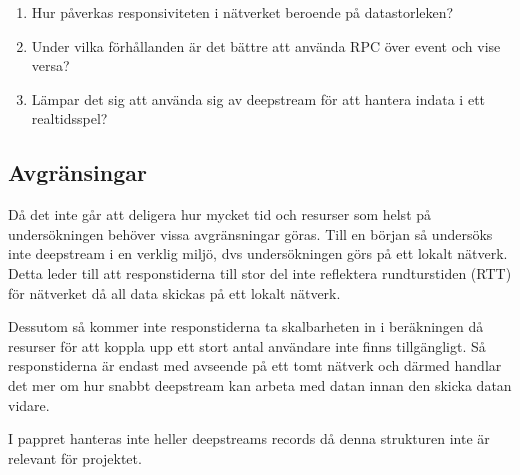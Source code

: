 \begin{enumerate}
\item Hur påverkas responsiviteten i nätverket beroende på datastorleken?  

\item Under vilka förhållanden är det bättre att använda RPC över event och vise versa?

\item Lämpar det sig att använda sig av deepstream för att hantera indata i ett realtidsspel?

\end{enumerate}
\subsection{Avgränsingar}
\label{subsec:tim-delimitations}
Då det inte går att deligera hur mycket tid och resurser som helst på undersökningen behöver vissa avgränsningar göras. Till en början så undersöks inte deepstream i en verklig miljö, dvs undersökningen görs på ett lokalt nätverk. Detta leder till att responstiderna till stor del inte reflektera rundturstiden (RTT) för nätverket då all data skickas på ett lokalt nätverk.

Dessutom så kommer inte responstiderna ta skalbarheten in i beräkningen då resurser för att koppla upp ett stort antal användare inte finns tillgängligt. Så responstiderna är endast med avseende på ett tomt nätverk och därmed handlar det mer om hur snabbt deepstream kan arbeta med datan innan den skicka datan vidare.

I pappret hanteras inte heller deepstreams records då denna strukturen inte är relevant för projektet.
